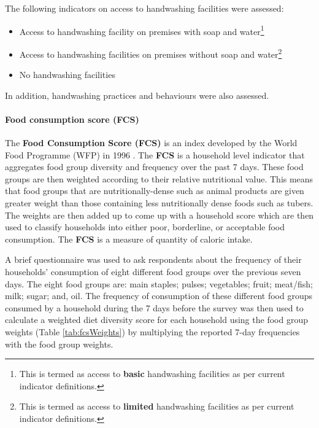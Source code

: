 \documentclass[12pt,a4paper]{article}
\let\oldparagraph\paragraph
\renewcommand{\paragraph}[1]{\oldparagraph{#1}\mbox{}}
\let\rmarkdownfootnote\footnote%
\def\footnote{\protect\rmarkdownfootnote}
\begin{document}
The following indicators on access to handwashing facilities were assessed:

\begin{itemize}
\item
  Access to handwashing facility on premises with soap and water\footnote{This is termed as access to \textbf{basic} handwashing facilities as per current indicator definitions.}
\item
  Access to handwashing facilities on premises without soap and water\footnote{This is termed as access to \textbf{limited} handwashing facilities as per current indicator definitions.}
\item
  No handwashing facilities
\end{itemize}

In addition, handwashing practices and behaviours were also assessed.

\hypertarget{fcs}{%
\paragraph{Food consumption score (FCS)}\label{fcs}}

The \textbf{Food Consumption Score (FCS)} is an index developed by the World Food Programme (WFP) in 1996 \citep{VulnerabilityAssessmentandMappingWorldFoodProgramme:2008ti}. The \textbf{FCS} is a household level indicator that aggregates food group diversity and frequency over the past 7 days. These food groups are then weighted according to their relative nutritional value. This means that food groups that are nutritionally-dense such as animal products are given greater weight than those containing less nutritionally dense foods such as tubers. The weights are then added up to come up with a household score which are then used to classify households into either poor, borderline, or acceptable food consumption. The \textbf{FCS} is a measure of quantity of caloric intake.

A brief questionnaire was used to ask respondents about the frequency of their households' consumption of eight different food groups over the previous seven days. The eight food groups are: main staples; pulses; vegetables; fruit; meat/fish; milk; sugar; and, oil. The frequency of consumption of these different food groups consumed by a household during the 7 days before the survey was then used to calculate a weighted diet diversity score for each household using the food group weights (Table \ref{tab:fcsWeights}) by multiplying the reported 7-day frequencies with the food group weights.
\end{document}
